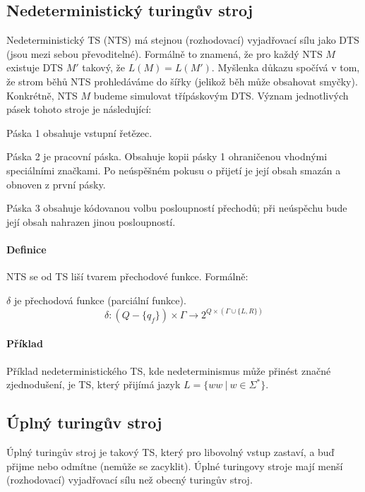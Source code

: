 \subsection{Nedeterministický turingův stroj}

Nedeterministický TS (NTS) má stejnou (rozhodovací) vyjadřovací sílu jako DTS (jsou mezi sebou převoditelné). Formálně to znamená, že pro každý NTS $M$ existuje DTS $M'$ takový, že $L(M) = L(M')$. Myšlenka důkazu spočívá v tom, že strom běhů NTS prohledáváme do šířky (jelikož běh může obsahovat smyčky). Konkrétně, NTS $M$ budeme simulovat třípáskovým DTS. Význam jednotlivých pásek tohoto
stroje je následující: \begin{compactitem}
    \item Páska 1 obsahuje vstupní řetězec.
    \item Páska 2 je pracovní páska. Obsahuje kopii pásky 1 ohraničenou vhodnými speciálními značkami. Po neúspěšném pokusu o přijetí je její obsah smazán a obnoven z první pásky.
    \item Páska 3 obsahuje kódovanou volbu posloupností přechodů; při neúspěchu bude její obsah nahrazen jinou posloupností.
\end{compactitem}

\paragraph*{Definice} NTS se od TS liší tvarem přechodové funkce. Formálně:

\begin{compactitem}
    \item $\delta$ je přechodová funkce (parciální funkce). $$\delta : (Q - \{ q_f \}) \times \Gamma \rightarrow 2^{Q \times (\Gamma \cup \{ L, R \})}$$
\end{compactitem}

\paragraph*{Příklad} Příklad nedeterministického TS, kde nedeterminismus může přinést značné zjednodušení, je TS, který přijímá jazyk $L = \{ ww ~|~ w \in \Sigma^* \}$.

\subsection{Úplný turingův stroj}

Úplný turingův stroj je takový TS, který pro libovolný vstup zastaví, a buď přijme nebo odmítne (nemůže se zacyklit). Úplné turingovy stroje mají menší (rozhodovací) vyjadřovací sílu než obecný turingův stroj.

